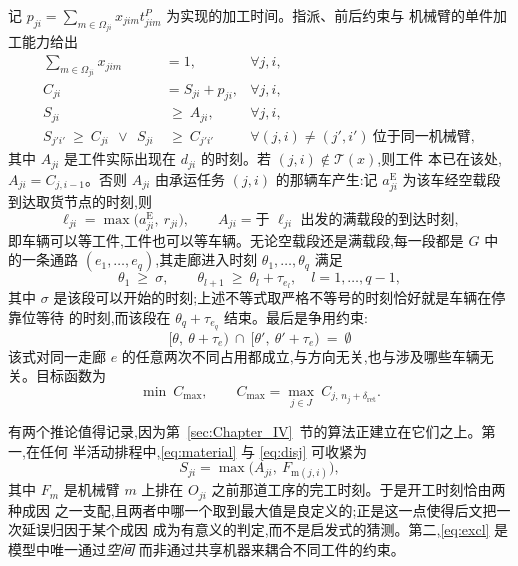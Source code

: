 \documentclass[manuscript,screen,review]{acmart}
\begin{document}
记 $p_{ji}=\sum_{m\in\Omega_{ji}}x_{jim}t^P_{jim}$ 为实现的加工时间。指派、前后约束与
机械臂的单件加工能力给出
\begin{align}
\sum_{m\in\Omega_{ji}} x_{jim} &= 1, & \forall j,i,
\label{eq:assign}\\
C_{ji} &= S_{ji}+p_{ji}, & \forall j,i,
\label{eq:dur}\\
S_{ji} &\ \ge\ A_{ji}, & \forall j,i,
\label{eq:material}\\
S_{j'i'}\ \ge\ C_{ji}\ \ \vee\ \ S_{ji} &\ \ge\ C_{j'i'}
& \forall (j,i)\neq(j',i')\ \text{位于同一机械臂},
\label{eq:disj}
\end{align}
其中 $A_{ji}$ 是工件实际出现在 $d_{ji}$ 的时刻。若 $(j,i)\notin\mathcal{T}(x)$,则工件
本已在该处,$A_{ji}=C_{j,i-1}$。否则 $A_{ji}$ 由承运任务 $(j,i)$ 的那辆车产生:记
$a^{\mathrm{E}}_{ji}$ 为该车经空载段到达取货节点的时刻,则
\begin{equation}
\label{eq:load}
\ell_{ji}=\max\bigl(a^{\mathrm{E}}_{ji},\ r_{ji}\bigr),
\qquad
A_{ji}=\text{于 } \ell_{ji} \text{ 出发的满载段的到达时刻},
\end{equation}
即车辆可以等工件,工件也可以等车辆。无论空载段还是满载段,每一段都是 $G$ 中的一条通路
$(e_1,\dots,e_q)$,其走廊进入时刻 $\theta_1,\dots,\theta_q$ 满足
\begin{equation}
\label{eq:walk}
\theta_1 \ \ge\ \sigma, \qquad
\theta_{l+1}\ \ge\ \theta_l+\tau_{e_l}, \quad l=1,\dots,q-1,
\end{equation}
其中 $\sigma$ 是该段可以开始的时刻;上述不等式取严格不等号的时刻恰好就是车辆在停靠位等待
的时刻,而该段在 $\theta_q+\tau_{e_q}$ 结束。最后是争用约束:
\begin{equation}
\label{eq:excl}
\bigl[\theta,\ \theta+\tau_e\bigr)\ \cap\
\bigl[\theta',\ \theta'+\tau_e\bigr)\ =\ \emptyset
\end{equation}
该式对同一走廊 $e$ 的任意两次不同占用都成立,与方向无关,也与涉及哪些车辆无关。目标函数为
\begin{equation}
\label{eq:obj}
\min\ C_{\max},\qquad
C_{\max}=\max_{j\in J}\ C_{j,\,n_j+\delta_{\mathrm{ret}}} .
\end{equation}

有两个推论值得记录,因为第~\ref{sec:Chapter_IV}~节的算法正建立在它们之上。第一,在任何
半活动排程中,\eqref{eq:material} 与 \eqref{eq:disj} 可收紧为
\begin{equation}
\label{eq:bind}
S_{ji}=\max\bigl(A_{ji},\ F_{\mathrm{m}(j,i)}\bigr),
\end{equation}
其中 $F_m$ 是机械臂 $m$ 上排在 $O_{ji}$ 之前那道工序的完工时刻。于是开工时刻恰由两种成因
之一支配,且两者中哪一个取到最大值是良定义的;正是这一点使得后文把一次延误归因于某个成因
成为有意义的判定,而不是启发式的猜测。第二,\eqref{eq:excl} 是模型中唯一通过\emph{空间}
而非通过共享机器来耦合不同工件的约束。
\end{document}
